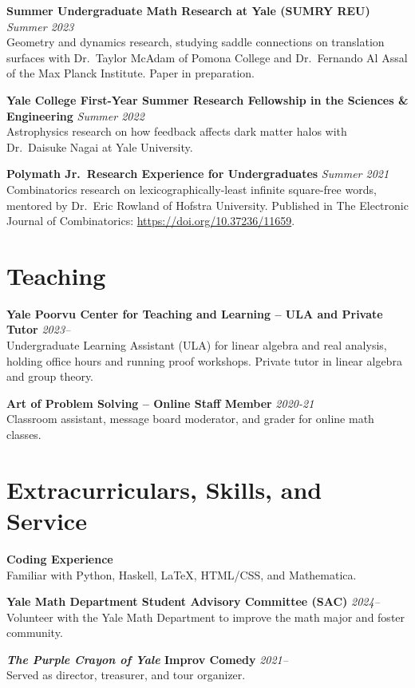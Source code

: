 \documentclass[11pt]{article}
\newcommand{\entry}[3]{
    \vspace{-.58em}
    \textbf{#1} \hfill \textit{#2} \\
    #3 \vspace{0.5em}}
\begin{document}
\entry{Summer Undergraduate Math Research at Yale (SUMRY REU)}{Summer 2023}{
  Geometry and dynamics research, studying saddle connections on translation surfaces with Dr.\ Taylor McAdam of Pomona College and Dr.\ Fernando Al Assal of the Max Planck Institute. Paper in preparation. %
}

\entry{Yale College First-Year Summer Research Fellowship in the Sciences \& Engineering}{Summer 2022}{
  Astrophysics research on how feedback affects dark matter halos with Dr.\ Daisuke Nagai at Yale University.
}

\entry{Polymath Jr.\ Research Experience for Undergraduates}{Summer 2021}{
  Combinatorics research on lexicographically-least infinite square-free words, mentored by Dr.\ Eric Rowland of Hofstra University. Published in The Electronic Journal of Combinatorics: \href{https://doi.org/10.37236/11659}{https://doi.org/10.37236/11659}.
}


\section*{Teaching}
\vspace{.58em}
\vspace{-0.1em}

\entry{Yale Poorvu Center for Teaching and Learning -- ULA and Private Tutor}{2023--}{
  Undergraduate Learning Assistant (ULA) for linear algebra and real analysis, holding office hours and running proof workshops. Private tutor in linear algebra and group theory.
}

\entry{Art of Problem Solving -- Online Staff Member}{2020-21}{
  Classroom assistant, message board moderator, and grader for online math classes.
}


\section*{Extracurriculars, Skills, and Service}
\vspace{0.58em}
\vspace{-0.1em}

\entry{Coding Experience}{}{
  Familiar with Python, Haskell, \LaTeX, HTML/CSS, and Mathematica.
}

\entry{Yale Math Department Student Advisory Committee (SAC)}{2024--}{
  Volunteer with the Yale Math Department to improve the math major and foster community.
}

\entry{\textit{The Purple Crayon of Yale} Improv Comedy}{2021--}{
  Served as director, treasurer, and tour organizer.
}
\end{document}
